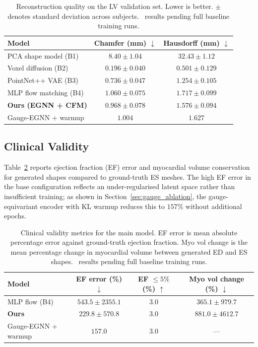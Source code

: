 \documentclass{article}
\begin{document}
\begin{table}[h]
\centering
\caption{Reconstruction quality on the LV validation set. Lower is better.
         $\pm$ denotes standard deviation across subjects.
         \textdagger~results pending full baseline training runs.}
\label{tab:reconstruction}
\begin{tabular}{lcc}
\toprule
Model & Chamfer (mm) $\downarrow$ & Hausdorff (mm) $\downarrow$ \\
\midrule
PCA shape model (B1)       & $8.40 \pm 1.04$  & $32.43 \pm 1.12$ \\
Voxel diffusion (B2)       & $0.196 \pm 0.040$ & $0.501 \pm 0.129$ \\
PointNet++ VAE (B3)        & $0.736 \pm 0.047$ & $1.254 \pm 0.105$ \\
MLP flow matching (B4)     & $1.060 \pm 0.075$ & $1.717 \pm 0.099$ \\
\midrule
\textbf{Ours (EGNN + CFM)} & $\mathbf{0.968 \pm 0.078}$ & $\mathbf{1.576 \pm 0.094}$ \\
Gauge-EGNN + warmup        & $1.004$                    & $1.627$                    \\
\bottomrule
\end{tabular}
\end{table}

\subsection{Clinical Validity}

Table~\ref{tab:clinical} reports ejection fraction (EF) error and myocardial
volume conservation for generated shapes compared to ground-truth ES meshes.
The high EF error in the base configuration reflects an under-regularised
latent space rather than insufficient training; as shown in
Section~\ref{sec:gauge_ablation}, the gauge-equivariant encoder with KL
warmup reduces this to $157\%$ without additional epochs.

\begin{table}[h]
\centering
\caption{Clinical validity metrics for the main model.
         EF error is mean absolute percentage error against ground-truth
         ejection fraction. Myo vol change is the mean percentage change
         in myocardial volume between generated ED and ES shapes.
         \textdagger~results pending full baseline training runs.}
\label{tab:clinical}
\begin{tabular}{lccc}
\toprule
Model & EF error (\%) $\downarrow$ & EF $\leq 5\%$ (\%) $\uparrow$ & Myo vol change (\%) $\downarrow$ \\
\midrule
MLP flow (B4)          & $543.5 \pm 2355.1$ & $3.0$              & $365.1 \pm 979.7$  \\
\textbf{Ours}          & $229.8 \pm 570.8$  & $3.0$              & $881.0 \pm 4612.7$ \\
Gauge-EGNN + warmup    & $\mathbf{157.0}$   & $3.0$              & ---                \\
\bottomrule
\end{tabular}
\end{table}
\end{document}
